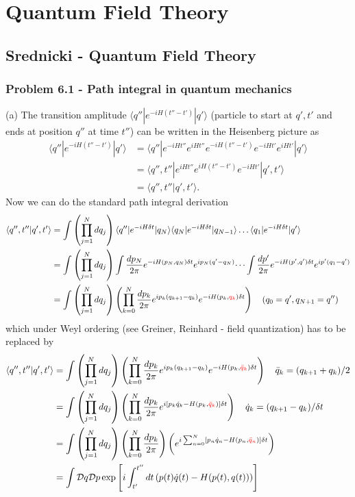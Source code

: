 \documentclass[10pt,a4paper]{article}
\theoremstyle{definition}
\begin{document}
\section{Quantum Field Theory}
\subsection{{\sc Srednicki} - Quantum Field Theory}
\subsubsection{Problem 6.1 - Path integral in quantum mechanics}
(a) The transition amplitude $\langle q''|e^{-iH(t''-t')}|q'\rangle$ (particle to start at $q',t'$ and ends at position $q''$ at time $t''$) can be written in the Heisenberg picture as
\begin{align}
    \langle q''|e^{-iH(t''-t')}|q'\rangle
    &=\langle q''|e^{-iHt''}e^{iHt''}e^{-iH(t''-t')}e^{-iHt'}e^{iHt'}|q'\rangle\\
    &=\langle q'',t''|e^{iHt''}e^{iH(t''-t')}e^{-iHt'}|q',t'\rangle\\
    &=\langle q'',t''|q',t'\rangle.
\end{align}
Now we can do the standard path integral derivation
\begin{align}
    \langle q'',t''|q',t'\rangle
    &=\int\left(\prod_{j=1}^N dq_j\right) \langle q''|e^{-iH\delta t}|q_N\rangle \langle q_N|e^{-iH\delta t}|q_{N-1}\rangle \dots \langle q_1|e^{-iH\delta t}|q'\rangle\\
    &=\int\left(\prod_{j=1}^N dq_j\right) \int\frac{dp_N}{2\pi}e^{-iH(p_N,q_N)\delta t}e^{ip_N(q'-q_N)} \dots  \int\frac{dp'}{2\pi}e^{-iH(p',q')\delta t}e^{ip'(q_1-q')}\\
    &=\int\left(\prod_{j=1}^N dq_j\right)\left(\prod_{k=0}^{N}\frac{dp_k}{2\pi} e^{ip_k(q_{k+1}-q_k)}e^{-iH(p_k,\textcolor{red}{q_k})\delta t}\right)\quad(q_0=q',q_{N+1}=q'')
\end{align}
which under Weyl ordering (see Greiner, Reinhard - field quantization) has to be replaced by
\begin{align}
    \langle q'',t''|q',t'\rangle
    &=\int\left(\prod_{j=1}^N dq_j\right)\left(\prod_{k=0}^{N}\frac{dp_k}{2\pi} e^{ip_k(q_{k+1}-q_k)}e^{-iH(p_k,\textcolor{red}{\bar{q}_k})\delta t}\right)\quad \bar{q}_k=(q_{k+1}+q_k)/2\\
    &=\int\left(\prod_{j=1}^N dq_j\right)\left(\prod_{k=0}^{N}\frac{dp_k}{2\pi} e^{i[p_k\dot{q}_k-H(p_k,\textcolor{red}{\bar{q}_k})]\delta t}\right)\quad \dot{q}_k=(q_{k+1}-q_k)/{\delta t}\\
    &=\int\left(\prod_{j=1}^N dq_j\right)\left(\prod_{k=0}^{N}\frac{dp_k}{2\pi}\right) \left(e^{i\sum_{n=0}^N[p_n\dot{q}_n-H(p_n,\textcolor{red}{\bar{q}_n})]\delta t}\right)\\
    &=\int\mathcal{D}q\mathcal{D}p\exp\left[i\int_{t'}^{t''}dt\left(p(t)\dot{q}(t)-H(p(t),q(t))\right)\right]
\end{align}
\end{document}
